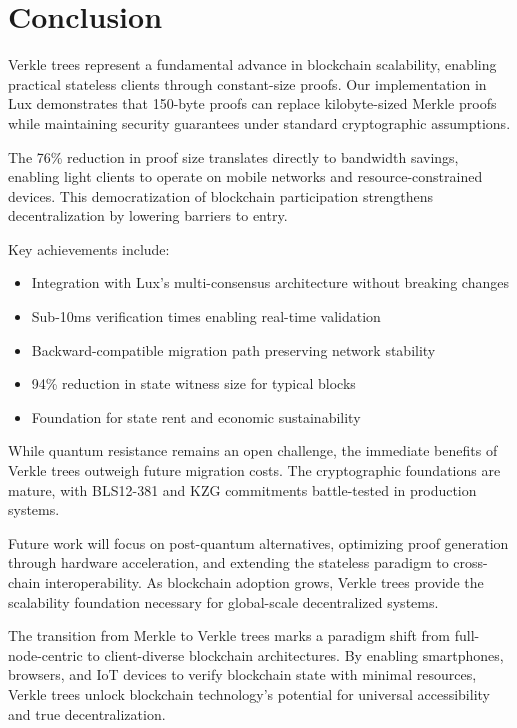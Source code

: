\section{Conclusion}


Verkle trees represent a fundamental advance in blockchain scalability, enabling practical stateless clients through constant-size proofs. Our implementation in Lux demonstrates that 150-byte proofs can replace kilobyte-sized Merkle proofs while maintaining security guarantees under standard cryptographic assumptions.

The 76\% reduction in proof size translates directly to bandwidth savings, enabling light clients to operate on mobile networks and resource-constrained devices. This democratization of blockchain participation strengthens decentralization by lowering barriers to entry.

Key achievements include:
\begin{itemize}
    \item Integration with Lux's multi-consensus architecture without breaking changes
    \item Sub-10ms verification times enabling real-time validation
    \item Backward-compatible migration path preserving network stability
    \item 94\% reduction in state witness size for typical blocks
    \item Foundation for state rent and economic sustainability
\end{itemize}

While quantum resistance remains an open challenge, the immediate benefits of Verkle trees outweigh future migration costs. The cryptographic foundations are mature, with BLS12-381 and KZG commitments battle-tested in production systems.

Future work will focus on post-quantum alternatives, optimizing proof generation through hardware acceleration, and extending the stateless paradigm to cross-chain interoperability. As blockchain adoption grows, Verkle trees provide the scalability foundation necessary for global-scale decentralized systems.

The transition from Merkle to Verkle trees marks a paradigm shift from full-node-centric to client-diverse blockchain architectures. By enabling smartphones, browsers, and IoT devices to verify blockchain state with minimal resources, Verkle trees unlock blockchain technology's potential for universal accessibility and true decentralization.

